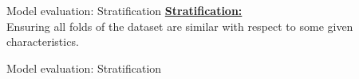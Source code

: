 \documentclass[10pt]{beamer}
\begin{document}
    \begin{frame}{Model evaluation: Stratification} %
        \textbf{\underline{Stratification:}}\\
        Ensuring all folds of the dataset are similar with respect to some given characteristics.
    \end{frame}

    \begin{frame}{Model evaluation: Stratification} %
\end{frame}
\end{document}
